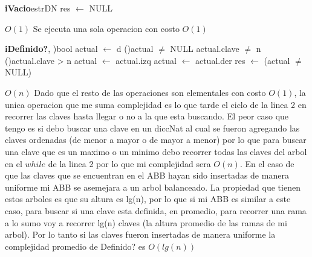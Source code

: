 \begin{Algoritmos}

\begin{algoritmo}{\textbf{iVacio}}{}{estrDN}
			res $\leftarrow$ NULL     	
\end{algoritmo}
\datosAlgoritmo{} %
  {} %
  {} %
  {$O(1)$} %
  {Se ejecuta una sola operacion con costo $O(1)$} %


\begin{algoritmo}{\textbf{iDefinido?}}{, )}{bool}
			actual $\leftarrow$ d 
            \While(){actual $\neq$ NULL \yluego actual.clave $\neq$ n}{
            	\eIf(){actual.clave > n}{
                	actual $\leftarrow$ actual.izq 
                }{
                	actual $\leftarrow$ actual.der 
                }
            }
            res $\leftarrow$ (actual $\neq$ NULL) 	
\end{algoritmo}
\datosAlgoritmo{} %
  {} %
  {} %
  {$O(n)$} %
  {Dado que el resto de las operaciones son elementales con costo $O(1)$, la unica operacion que me suma complejidad es lo que tarde el ciclo de la linea 2 en recorrer las claves hasta llegar o no a la que esta buscando. El peor caso que tengo es si debo buscar una clave en un diccNat al cual se fueron agregando las claves ordenadas (de menor a mayor o de mayor a menor) por lo que para buscar una clave que es un maximo o un minimo debo recorrer todas las claves del arbol en el $while$ de la linea 2 por lo que mi complejidad sera $O(n)$. En el caso de que las claves que se encuentran en el ABB hayan sido insertadas de manera uniforme mi ABB se asemejara a un arbol balanceado. La propiedad que tienen estos arboles es que su altura es lg(n), por lo que si mi ABB es similar a este caso, para buscar si una clave esta definida, en promedio, para recorrer una rama a lo sumo voy a recorrer lg(n) claves (la altura promedio de las ramas de mi arbol). Por lo tanto si las claves fueron insertadas de manera uniforme la complejidad promedio de Definido? es $O(lg(n))$ } %


\end{Algoritmos}
